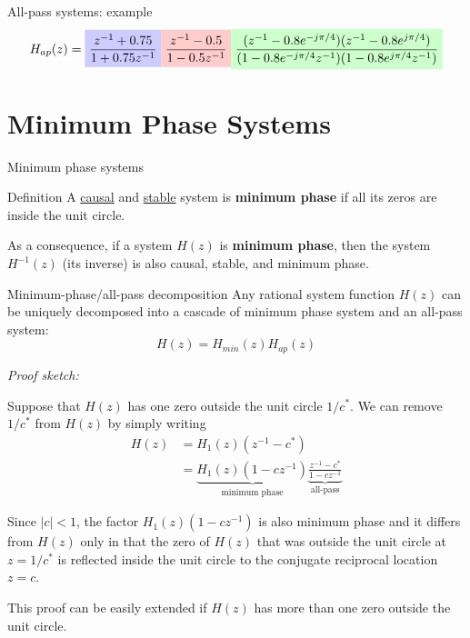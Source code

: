 \documentclass[10pt]{beamer}
\begin{document}
%
\begin{frame}{All-pass systems: example}
\begin{equation*}
H_{ap}(z) = \tikz[baseline]{\node[fill=blue!20,anchor=base] {$\displaystyle\frac{z^{-1}+ 0.75}{1 + 0.75z^{-1}}$};}\tikz[baseline]{\node[fill=red!20,anchor=base] {$\displaystyle\frac{z^{-1} - 0.5}{1 -0.5z^{-1}}$};}\tikz[baseline]{\node[fill=green!20,anchor=base] {$\displaystyle\frac{(z^{-1} - 0.8e^{-j\pi/4})(z^{-1} - 0.8e^{j\pi/4})}{(1 - 0.8e^{-j\pi/4}z^{-1})(1 - 0.8e^{j\pi/4}z^{-1})}$};}
\end{equation*}

\begin{center}
	\resizebox{\linewidth}{!}{}
\end{center}
\end{frame}

\section{Minimum Phase Systems}
%
\begin{frame}{Minimum phase systems}
	\begin{block}{Definition}
		A \underline{causal} and \underline{stable} system is \textbf{minimum phase} if all its zeros are inside the unit circle.
	\end{block}

	As a consequence, if a system $H(z)$ is \textbf{minimum phase}, then the system $H^{-1}(z)$ (its inverse) is also causal, stable, and minimum phase.
	
\end{frame}

%
\begin{frame}{Minimum-phase/all-pass decomposition}
	Any rational system function $H(z)$ can be uniquely decomposed into a cascade of minimum phase system and an all-pass system:
	\begin{equation*}
	H(z) = H_{min}(z)H_{ap}(z)
	\end{equation*}
	
\textit{Proof sketch:}

Suppose that $H(z)$ has one zero outside the unit circle $1/c^*$. We can remove $1/c^*$ from $H(z)$ by simply writing
\begin{align*}
H(z) &= H_1(z)(z^{-1} - c^*) \\
&= \underbrace{H_1(z)(1 - cz^{-1})}_{\text{minimum phase}}\underbrace{\frac{z^{-1} - c^*}{1 - cz^{-1}}}_{\text{all-pass}}
\end{align*}

Since $|c| < 1$, the factor $H_1(z)(1 - cz^{-1})$ is also minimum phase and it differs from $H(z)$ only in that the zero of $H(z)$ that was outside the unit circle at $z = 1/c^*$ is reflected inside the unit circle to the conjugate reciprocal location $z = c$. 

This proof can be easily extended if $H(z)$ has more than one zero outside the unit circle.
	
\end{frame}
\end{document}
